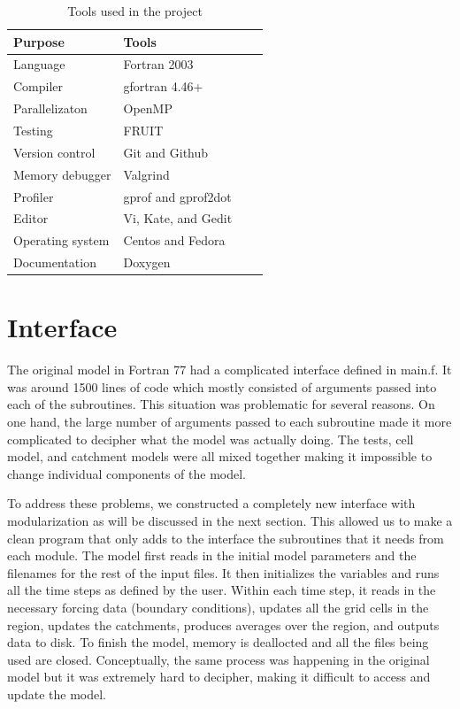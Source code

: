 \documentclass[pdftex,12pt,a4paper]{article}
\begin{document}
\begin{table}[ht]
  \begin{center}
    \caption{Tools used in the project}
    \begin{tabular}{ | l | l | l | p{5cm} |}
    \hline
    Purpose & Tools \\ \hline
    Language & Fortran 2003 \\
    Compiler & gfortran 4.46+ \\
    Parallelizaton & OpenMP \\
    Testing & FRUIT \\ 
    Version control & Git and Github \\ 
    Memory debugger & Valgrind \\ 
    Profiler & gprof and gprof2dot\\ 
    Editor & Vi, Kate, and Gedit \\
    Operating system & Centos and Fedora \\
    Documentation & Doxygen \\ \hline
    \end{tabular}
  \end{center}
\end{table}

\section{Interface}
The original model in Fortran 77 had a complicated interface defined in main.f. It was around 1500 lines of code which mostly consisted of arguments passed into each of the subroutines. This situation was problematic for several reasons. On one hand, the large number of arguments passed to each subroutine made it more complicated to decipher what the model was actually doing. The tests, cell model, and catchment models were all mixed together making it impossible to change individual components of the model. 

To address these problems, we constructed a completely new interface with modularization as will be discussed in the next section. This allowed us to make a clean program that only adds to the interface the subroutines that it needs from each module. The model first reads in the initial model parameters and the filenames for the rest of the input files. It then initializes the variables and runs all the time steps as defined by the user. Within each time step, it reads in the necessary forcing data (boundary conditions), updates all the grid cells in the region, updates the catchments, produces averages over the region, and outputs data to disk. To finish the model, memory is deallocted and all the files being used are closed. Conceptually, the same process was happening in the original model but it was extremely hard to decipher, making it difficult to access and update the model. 
\end{document}
